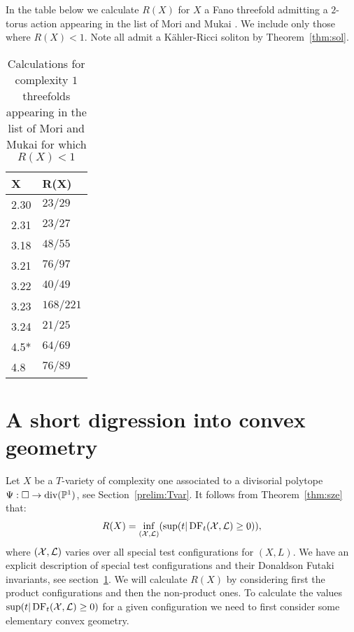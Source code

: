 \begin{corollary} \label{cor:R(X)}
In the table below we calculate \(R(X)\) for \(X\) a Fano threefold  admitting a \(2\)-torus action appearing in the list of Mori and Mukai \cite{mori1981classification}. We include only those where \(R(X) <1\). Note all admit a K\"ahler-Ricci soliton by Theorem~\ref{thm:sol}.
\end{corollary}
\begin{table}[H] \centering
\captionsetup{width=.95\linewidth}
\caption{Calculations for complexity \(1\) threefolds appearing in the list of Mori and Mukai for which \(R(X) <1\)}
\begin{tabular}{l l}
\hline
X & R(X) \\
\hline
2.30 & \(23/29\) \\
2.31 & \(23/27\) \\
3.18 & \(48/55\) \\
3.21 & \(76/97\) \\
3.22 & \(40/49\) \\
3.23 & \(168/221\) \\
3.24 & \(21/25\) \\
4.5* & \(64/69\) \\
4.8 & \(76/89\) \\
\hline
\end{tabular}
\label{table:name}
\end{table}
\section{A short digression into convex geometry}
Let \(X\) be a \(T\)-variety of complexity one associated to a divisorial polytope \(\Psi: \Box \to \text{div}(\mathbb{P}^1)\), see Section~\ref{prelim:Tvar}.
It follows from Theorem~\ref{thm:sze} that:
\begin{align*}
R(X) = \inf_{({\mathcal{X}},\mathcal{L})}( \sup(t | \mathop{\rm DF}\nolimits_t({\mathcal{X}},\mathcal{L}) \ge 0) ),
\end{align*}
where \(({\mathcal{X}},\mathcal{L})\) varies over all special test configurations for \((X,L)\). We have an explicit description of special test configurations and their Donaldson Futaki invariants, see section~\ref{}. We will calculate \(R(X)\) by considering first the product configurations and then the non-product ones. To calculate the values \(\sup(t | \mathop{\rm DF}\nolimits_t({\mathcal{X}},\mathcal{L}) \ge 0)\) for a given configuration we need to first consider some elementary convex geometry.

